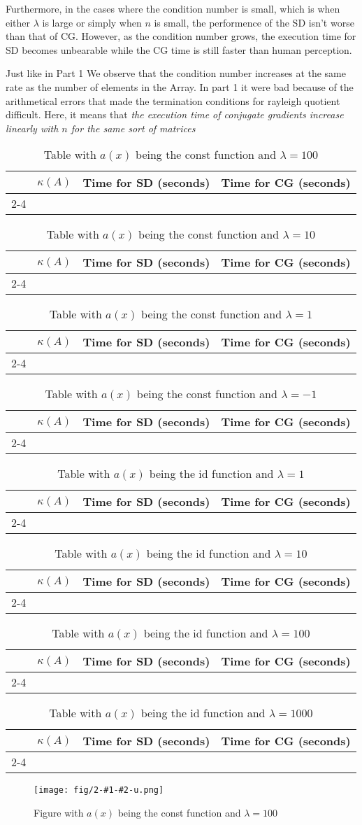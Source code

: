 \documentclass[a4paper,11pt]{article}
\begin{document}
Furthermore, in the cases where the condition number is small, which is
when either $\lambda$ is large or simply when $n$ is small, the
performence of the SD isn't worse than that of CG. However, as the
condition number grows, the execution time for SD becomes unbearable while
the CG time is still faster than human perception.

Just like in Part 1 We observe that the condition number increases at
the same rate as the number of elements in the Array. In part 1 it
were bad because of the arithmetical errors that made the termination
conditions for rayleigh quotient difficult. Here, it means that
\emph{the execution time of conjugate gradients increase linearly with
$n$ for the same sort of matrices}


\newcommand{\ctentries}[3] {
  \ensuremath{n=#3} & 
                    & 
                    & 
                    \\ \cline{2-4}
}

\newcommand{\cttable}[2] {
  \begin{table}[h]
    \centering
    \begin{tabular}{r|c|c|c|}
      \multicolumn{1}{r}{}
      & \multicolumn{1}{c}{\ensuremath{\kappa(A)}}
       & \multicolumn{1}{c}{Time for SD (seconds)}
       & \multicolumn{1}{c}{Time for CG (seconds)}\\
      \cline{2-4}
      \fornTwo{\ctentries{#1}{#2}}
    \end{tabular}
    \caption{Table with \ensuremath{a(x)} being the #1 function and
    \ensuremath{\lambda = #2}}
    \label{tab:ct-#1-#2}
  \end{table}
}

\cttable{const}{100}
\cttable{const}{10}
\cttable{const}{1}
\cttable{const}{-1}
\cttable{id}{1}
\cttable{id}{10}
\cttable{id}{100}
\cttable{id}{1000}



\newcommand{\genfig}[2]{
    \centering
    \begin{figure}
      \texttt{[image: fig/2-\#1-\#2-u.png]}
      \caption{Figure with \ensuremath{a(x)} being the #1 function and
    \ensuremath{\lambda = #2}}
      \label{fig:#1-#2}
    \end{figure}
}


\genfig{const}{100}
\end{document}
